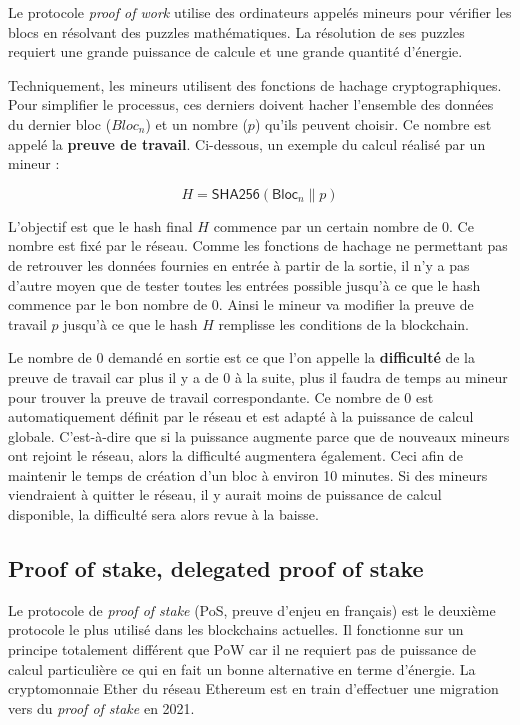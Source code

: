 Le protocole \textit{proof of work} utilise des ordinateurs appelés mineurs pour vérifier les blocs en résolvant des puzzles mathématiques. La résolution de ses puzzles requiert une grande puissance de calcule et une grande quantité d'énergie.

Techniquement, les mineurs utilisent des fonctions de hachage cryptographiques. Pour simplifier le processus, ces derniers doivent hacher l'ensemble des données du dernier bloc ($Bloc_n$) et un nombre ($p$) qu'ils peuvent choisir. Ce nombre est appelé la \textbf{preuve de travail}. Ci-dessous, un exemple du calcul réalisé par un mineur :

\begin{equation*}
    H = \textsf{SHA256}(\textsf{Bloc}_n \| p)
\end{equation*}

L'objectif est que le hash final $H$ commence par un certain nombre de 0. Ce nombre est fixé par le réseau. Comme les fonctions de hachage ne permettant pas de retrouver les données fournies en entrée à partir de la sortie, il n'y a pas d'autre moyen que de tester toutes les entrées possible jusqu'à ce que le hash commence par le bon nombre de 0. Ainsi le mineur va modifier la preuve de travail $p$ jusqu'à ce que le hash $H$ remplisse les conditions de la blockchain. 

Le nombre de 0 demandé en sortie est ce que l'on appelle la \textbf{difficulté} de la preuve de travail car plus il y a de 0 à la suite, plus il faudra de temps au mineur pour trouver la preuve de travail correspondante. Ce nombre de 0 est automatiquement définit par le réseau et est adapté à la puissance de calcul globale. C'est-à-dire que si la puissance augmente parce que de nouveaux mineurs ont rejoint le réseau, alors la difficulté augmentera également. Ceci afin de maintenir le temps de création d'un bloc à environ 10 minutes. Si des mineurs viendraient à quitter le réseau, il y aurait moins de puissance de calcul disponible, la difficulté sera alors revue à la baisse.

\subsection{Proof of stake, delegated proof of stake}
\label{consensus:pos}

Le protocole de \textit{proof of stake} (PoS, preuve d'enjeu en français) est le deuxième protocole le plus utilisé dans les blockchains actuelles. Il fonctionne sur un principe totalement différent que PoW car il ne requiert pas de puissance de calcul particulière ce qui en fait un bonne alternative en terme d'énergie. La cryptomonnaie Ether du réseau Ethereum est en train d'effectuer une migration vers du \textit{proof of stake} en 2021.

